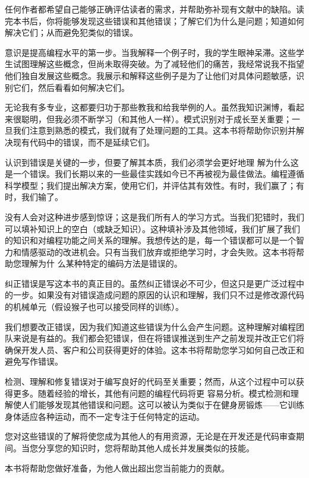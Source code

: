任何作者都希望自己能够正确评估读者的需求，并帮助弥补现有文献中的缺陷。读完本书后，你将能够发现这些错误和其他错误；了解它们为什么是问题；知道如何解决它们；从而避免犯类似的错误。


意识是提高编程水平的第一步。当我解释一个例子时，我的学生眼神呆滞。这些学生试图理解这些概念，但尚未取得突破。为了减轻他们的痛苦，我经常说我不指望他们独自发展这些概念。我展示和解释这些例子是为了让他们对具体问题敏感，识别它们，然后看看如何解决它们。

无论我有多专业，这都要归功于那些教我和给我举例的人。虽然我知识渊博，看起来很聪明，但我必须不断学习（和其他人一样）。模式识别对于成长至关重要；一旦我们注意到熟悉的模式，我们就有了处理问题的工具。这本书将帮助你识别并解决现有代码中的错误，而不是延续它们。


认识到错误是关键的一步，但要了解其本质，我们必须学会更好地理 解为什么这是一个错误。我们长期以来的一些最佳实践如今已不再被视为最佳做法。编程遵循科学模型；我们提出解决方案，使用它们，并评估其有效性。有时，我们赢了；有时，我们输了。

没有人会对这种进步感到惊讶；这是我们所有人的学习方式。当我们犯错时，我们可以填补知识上的空白（或缺乏知识）。这种填补涉及其他领域，我们扩展了我们的知识和对编程功能之间关系的理解。我想传达的是，每一个错误都可以是一个智力和情感驱动的改进机会。只有当我们放弃或拒绝学习时，才会失败。这本书将帮助您理解为什 么某种特定的编码方法是错误的。


纠正错误是写这本书的真正目的。虽然纠正错误必不可少，但这只是更广泛过程中的一步。如果没有对错误造成问题的原因的认识和理解，我们只不过是修改源代码的机械单元（假设猴子也可以接受同样的训练）。

我们想要改正错误，因为我们知道这些错误为什么会产生问题。这种理解对编程团队来说是有益的。我们都会犯错误，但在将错误推送到生产之前发现并改正它们将确保开发人员、客户和公司获得更好的体验。这本书将帮助您学习如何自己改正和避免写作错误。


检测、理解和修复错误对于编写良好的代码至关重要；然而，从这个过程中可以获得更多。随着经验的增长，其他有问题的编程代码将更 容易分析。模式检测和理解使人们能够发现其他错误和问题。这可以被认为类似于在健身房锻炼——它训练身体适应各种运动，而不一定专注于任何特定的运动。

您对这些错误的了解将使您成为其他人的有用资源，无论是在开发还是代码审查期间。当您分享您的知识时，您将帮助其他人成长并发展类似的技能。

本书将帮助您做好准备，为他人做出超出您当前能力的贡献。



